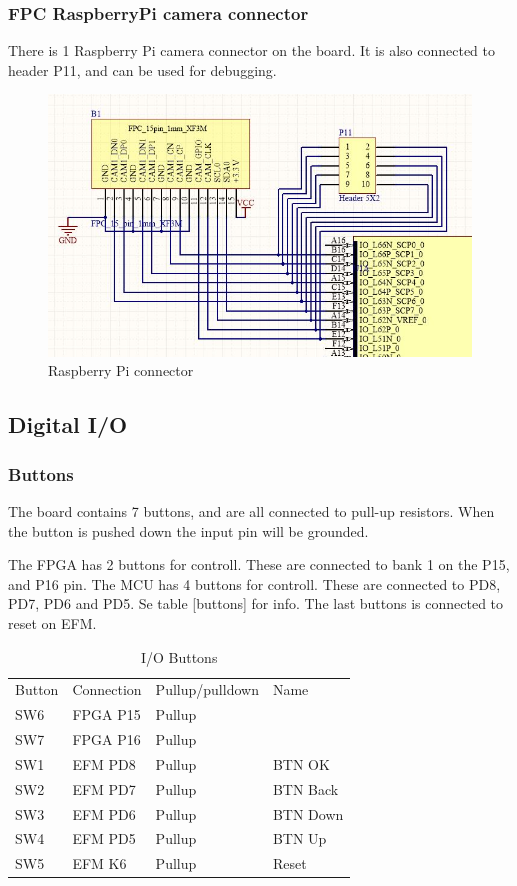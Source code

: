 \subsubsection{FPC RaspberryPi camera connector}
There is 1 Raspberry Pi camera connector on the board. It is also connected to header P11, and can be used for debugging.

\begin{figure}
    \includegraphics[width=\linewidth]{img/fpc_header.jpg}
    \caption{Raspberry Pi connector}
    \label{fig:fpc_header}
\end{figure}

\subsection{Digital I/O}
\subsubsection{Buttons}
The board contains 7 buttons, and are all connected to pull-up resistors. When the button is pushed down the input pin will be grounded. 

The FPGA has 2 buttons for controll. These are connected to bank 1 on the P15, and P16 pin.
The MCU has 4 buttons for controll. These are connected to PD8, PD7, PD6 and PD5. Se table [buttons] for info.
The last buttons is connected to reset on EFM. 

\begin{table}[]
    \centering
    \caption{I/O Buttons}
    \label{buttons}
    \begin{tabular}{llll}
        Button & Connection & Pullup/pulldown & Name     \\
        SW6    & FPGA P15   & Pullup          &          \\
        SW7    & FPGA P16   & Pullup          &          \\
        SW1    & EFM PD8    & Pullup          & BTN OK   \\
        SW2    & EFM PD7    & Pullup          & BTN Back \\
        SW3    & EFM PD6    & Pullup          & BTN Down \\
        SW4    & EFM PD5    & Pullup          & BTN Up   \\
        SW5    & EFM K6     & Pullup          & Reset
    \end{tabular}
\end{table}

